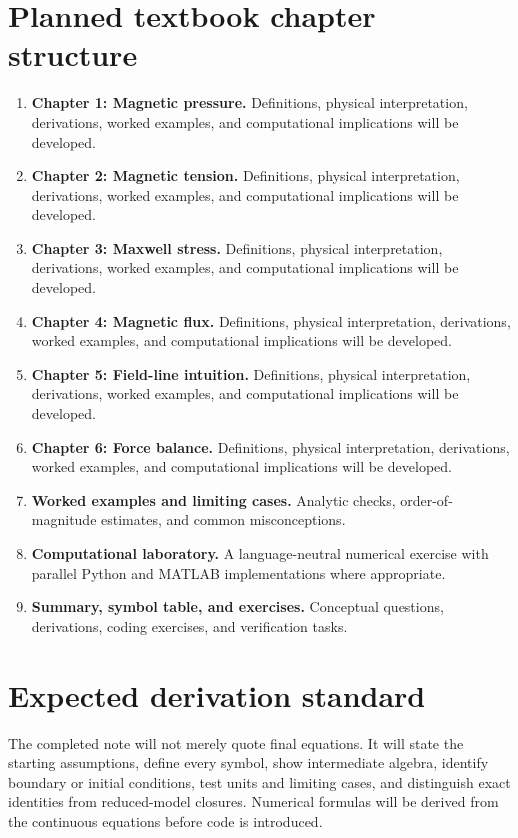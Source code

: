 \documentclass[11pt]{article}
\begin{document}
\section{Planned textbook chapter structure}
\begin{enumerate}[leftmargin=1.8em]
\item \textbf{Chapter 1: Magnetic pressure.} Definitions, physical interpretation, derivations, worked examples, and computational implications will be developed.
\item \textbf{Chapter 2: Magnetic tension.} Definitions, physical interpretation, derivations, worked examples, and computational implications will be developed.
\item \textbf{Chapter 3: Maxwell stress.} Definitions, physical interpretation, derivations, worked examples, and computational implications will be developed.
\item \textbf{Chapter 4: Magnetic flux.} Definitions, physical interpretation, derivations, worked examples, and computational implications will be developed.
\item \textbf{Chapter 5: Field-line intuition.} Definitions, physical interpretation, derivations, worked examples, and computational implications will be developed.
\item \textbf{Chapter 6: Force balance.} Definitions, physical interpretation, derivations, worked examples, and computational implications will be developed.
\item \textbf{Worked examples and limiting cases.} Analytic checks, order-of-magnitude estimates, and common misconceptions.
\item \textbf{Computational laboratory.} A language-neutral numerical exercise with parallel Python and MATLAB implementations where appropriate.
\item \textbf{Summary, symbol table, and exercises.} Conceptual questions, derivations, coding exercises, and verification tasks.
\end{enumerate}

\section{Expected derivation standard}
The completed note will not merely quote final equations. It will state the starting assumptions, define every symbol, show intermediate algebra, identify boundary or initial conditions, test units and limiting cases, and distinguish exact identities from reduced-model closures. Numerical formulas will be derived from the continuous equations before code is introduced.
\end{document}
